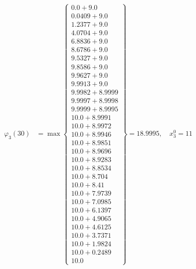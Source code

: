 \documentclass{article}
\begin{document}
\begin{align*}
\varphi_{3}(30) &= \max \left\{ \begin{array}{c}
0.0 + 9.0 \\
 0.0409 + 9.0 \\
 1.2377 + 9.0 \\
 4.0704 + 9.0 \\
 6.8836 + 9.0 \\
 8.6786 + 9.0 \\
 9.5327 + 9.0 \\
 9.8586 + 9.0 \\
 9.9627 + 9.0 \\
 9.9913 + 9.0 \\
 9.9982 + 8.9999 \\
 9.9997 + 8.9998 \\
 9.9999 + 8.9995 \\
 10.0 + 8.9991 \\
 10.0 + 8.9972 \\
 10.0 + 8.9946 \\
 10.0 + 8.9851 \\
 10.0 + 8.9696 \\
 10.0 + 8.9283 \\
 10.0 + 8.8534 \\
 10.0 + 8.704 \\
 10.0 + 8.41 \\
 10.0 + 7.9739 \\
 10.0 + 7.0985 \\
 10.0 + 6.1397 \\
 10.0 + 4.9065 \\
 10.0 + 4.6125 \\
 10.0 + 3.7371 \\
 10.0 + 1.9824 \\
 10.0 + 0.2489 \\
 10.0
\end{array} \right\}=18.9995, \quad x_{3}^0=11\\
  

\end{align*}
\end{document}
